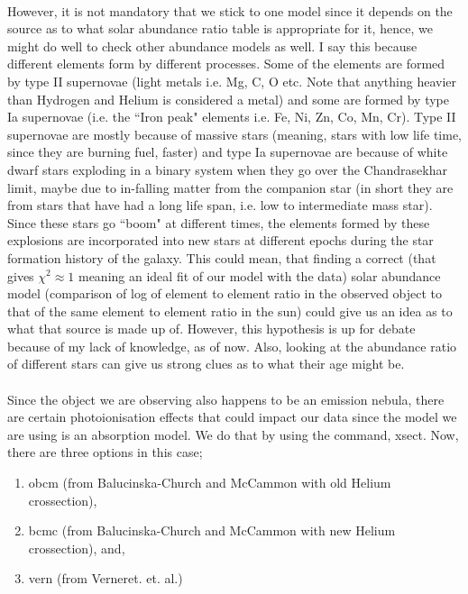 \documentclass[a4paper,twoside]{report}
\numberwithin{equation}{section}
\begin{document}
\paragraph{}
However, it is not mandatory that we stick to one model since it depends on the source as to what solar abundance ratio table is appropriate for it, hence, we might do well to check other abundance models as well. I say this because different elements form by different processes. Some of the elements are formed by type II supernovae (light metals i.e. Mg, C, O etc. Note that anything heavier than Hydrogen and Helium is considered a metal) and some are formed by type Ia supernovae (i.e. the ``Iron peak" elements i.e. Fe, Ni, Zn, Co, Mn, Cr). Type II supernovae are  mostly because of massive stars (meaning, stars with low life time, since they are burning fuel, faster) and type Ia supernovae are because of white dwarf stars exploding in a binary system when they go over the Chandrasekhar limit, maybe due to in-falling matter from the companion star (in short they are from stars that have had a long life span, i.e. low to intermediate mass star). Since these stars go ``boom" at different times, the elements formed by these explosions are incorporated into new stars at different epochs during the star formation history of the galaxy. This could mean, that finding a correct (that gives $\chi ^2 \approx 1$ meaning an ideal fit of our model with the data) solar abundance model (comparison of log of element to element ratio in the observed object to that of the same element to element ratio in the sun) could give us an idea as to what that source is made up of. However, this hypothesis is up for debate because of my lack of knowledge, as of now. Also, looking at the abundance ratio of different stars can give us strong clues as to what their age might be.
\paragraph{}
Since the object we are observing also happens to be an emission nebula, there are certain photoionisation effects that could impact our data since the model we are using is an absorption model. We do that by using the command, xsect. Now, there are three options in this case;
\begin{enumerate}
\item obcm (from Balucinska-Church and McCammon with old Helium crossection), 
\item bcmc (from Balucinska-Church and McCammon with new Helium crossection), and,
\item vern (from Verneret. et. al.)
\end{enumerate}
\end{document}
